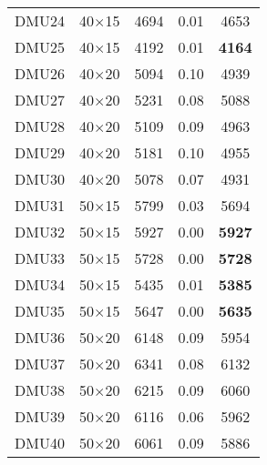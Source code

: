 \begin{table}[H]
\begin{tabular}{@{}ccccc@{}}
DMU24 & 40$\times$15 & 4694 & 0.01 & 4653\\ 
DMU25 & 40$\times$15 & 4192 & 0.01 & \textbf{4164}\\ 
DMU26 & 40$\times$20 & 5094 & 0.10 & 4939\\ 
DMU27 & 40$\times$20 & 5231 & 0.08 & 5088\\ 
DMU28 & 40$\times$20 & 5109 & 0.09 & 4963\\ 
DMU29 & 40$\times$20 & 5181 & 0.10 & 4955\\ 
DMU30 & 40$\times$20 & 5078 & 0.07 & 4931\\ 
DMU31 & 50$\times$15 & 5799 & 0.03 & 5694\\ 
DMU32 & 50$\times$15 & 5927 & 0.00 & \textbf{5927}\\ 
DMU33 & 50$\times$15 & 5728 & 0.00 & \textbf{5728}\\ 
DMU34 & 50$\times$15 & 5435 & 0.01 & \textbf{5385}\\ 
DMU35 & 50$\times$15 & 5647 & 0.00 & \textbf{5635}\\ 
DMU36 & 50$\times$20 & 6148 & 0.09 & 5954\\ 
DMU37 & 50$\times$20 & 6341 & 0.08 & 6132\\ 
DMU38 & 50$\times$20 & 6215 & 0.09 & 6060\\ 
DMU39 & 50$\times$20 & 6116 & 0.06 & 5962\\ 
DMU40 & 50$\times$20 & 6061 & 0.09 & 5886\\ \bottomrule
\end{tabular}
\end{table}

